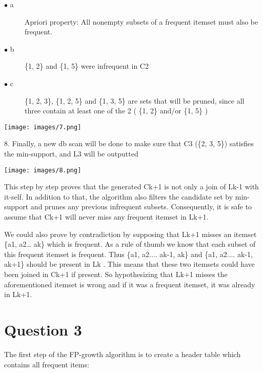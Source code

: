 \documentclass[a4paper]{article}
\begin{document}
\begin{description}
    \item[$\bullet$ a] Apriori property: All nonempty subsets of a frequent itemset must also be frequent.
    \item[$\bullet$ b] \{1, 2\} and \{1, 5\} were infrequent in C2
    \item[$\bullet$ c] \{1, 2, 3\}, \{1, 2, 5\} and \{1, 3, 5\} are sets that will be pruned, since all three contain at least one of the 2 ( \{1, 2\} and/or \{1, 5\} )
\end{description}

\begin{center}
\texttt{[image: images/7.png]}
\end{center}

8. Finally, a new db scan will be done to make sure that C3 (\{2, 3, 5\}) satisfies the min-support, and L3 will be outputted

\begin{center}
\texttt{[image: images/8.png]}
\end{center}

This step by step proves that the generated Ck+1 is not only a join of Lk-1 with it-self. In addition to that, the algorithm also filters the candidate set by min-support and prunes any previous infrequent subsets. Consequently, it is safe to assume that Ck+1 will never miss any frequent itemset in Lk+1.

We could also prove by contradiction by supposing that Lk+1 misses an itemset \{a1, a2… ak\} which is frequent. As a rule of thumb we know that each subset of this frequent itemset is frequent. Thus \{a1, a2.... ak-1, ak\} and \{a1, a2.... ak-1, ak+1\} should be present in  Lk . This means that these two itemsets could have been joined in Ck+1 if present. So hypothesizing that Lk+1 misses the aforementioned itemset is wrong and if it was a frequent itemset, it was already in Lk+1.

\section*{Question 3}

The first step of the FP-growth algorithm is to create a header table which contains all frequent items:
\end{document}
